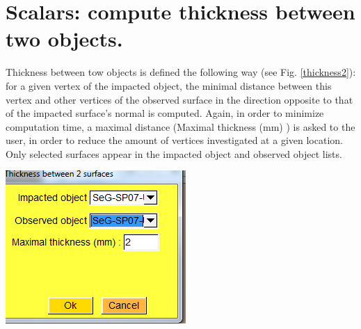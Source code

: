 \section{Scalars: compute thickness between two objects.}
\noindent
\begin{minipage}{0.5\textwidth}
Thickness between tow objects is defined the following way (see Fig. \ref{thickness2}):
for a given vertex of the impacted object, the minimal distance
between this vertex and other vertices of the observed surface in
the direction opposite to that of the impacted surface's normal
is computed. Again, in order to minimize computation time, a
maximal distance (Maximal thickness (mm) ) is asked to the user,
in order to reduce the amount of vertices investigated at a given
location. Only selected surfaces appear in the impacted object
and observed object lists.
\end{minipage}    
\begin{minipage}{0.5\textwidth}\centering
  \includegraphics[scale=0.5]{images/Scalars_renreding/Thickness_window2.png}
\label{thickness_window2}
 \end{minipage} 
\noindent


